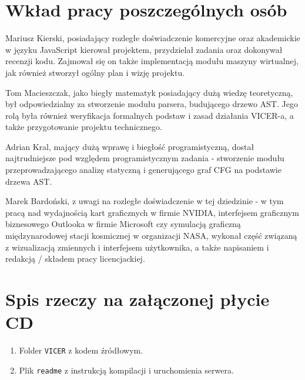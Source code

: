 \documentclass[a4paper,twoside,openright,11pt]{report}
\begin{document}
  \chapter {Wkład pracy poszczególnych osób}
\par Mariusz Kierski, posiadający rozległe doświadczenie komercyjne oraz akademickie w języku JavaScript kierował projektem, przydzielał zadania oraz dokonywał recenzji kodu. Zajmował się on także implementacją modułu maszyny wirtualnej, jak również stworzył ogólny plan i wizję projektu.
\par Tom Macieszczak, jako biegły matematyk posiadający dużą wiedzę teoretyczną, był odpowiedzialny za stworzenie modułu parsera, budującego drzewo AST. Jego rolą była również weryfikacja formalnych podstaw i zasad działania VICER-a, a także przygotowanie projektu technicznego.
\par Adrian Kral, mający dużą wprawę i biegłość programistyczną, dostał najtrudniejsze pod względem programistycznym zadania - stworzenie modułu przeprowadzającego analizę statyczną i generującego graf CFG na podstawie drzewa AST.  
\par Marek Bardoński, z uwagi na rozległe doświadczenie w tej dziedzinie - w tym pracą nad wydajnością kart graficznych w firmie NVIDIA, interfejsem graficznym biznesowego Outlooka w firmie Microsoft czy symulacją graficzną międzynarodowej stacji kosmicznej w organizacji NASA, wykonał część związaną z wizualizacją zmiennych i interfejsem użytkownika, a także napisaniem i redakcją / składem pracy licencjackiej.

  \chapter {Spis rzeczy na załączonej płycie CD}
  \begin {enumerate}
    \item Folder \texttt{VICER} z kodem źródłowym.
    \item Plik \texttt{readme} z instrukcją kompilacji i uruchomienia serwera.
  \end {enumerate}
  
\end{document}
